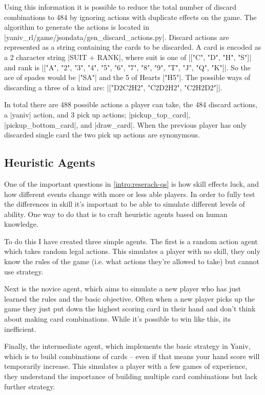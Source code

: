 \documentclass[../main.tex]{subfiles}
\begin{document}
Using this information it is possible to reduce the total number of discard combinations to 484 by ignoring actions with duplicate effects on the game. The algorithm to generate the actions is located in |yaniv_rl/game/jsondata/gen_discard_actions.py|. Discard actions are represented as a string containing the cards to be discarded. A card is encoded as a 2 character string |SUIT + RANK|, where suit is one of |["C", "D", "H", "S"]| and rank is |["A", "2", "3", "4", "5", "6", "7", "8", "9", "T", "J", "Q", "K"]|. So the ace of spades would be |"SA"| and the 5 of Hearts |"H5"|. The possible ways of discarding a three of a kind are: |["D2C2H2", "C2D2H2", "C2H2D2"]|. 

In total there are 488 possible actions a player can take, the 484 discard actions, a |yaniv| action, and 3 pick up actions; |pickup_top_card|, |pickup_bottom_card|, and |draw_card|. When the previous player has only 
discarded single card the two pick up actions are synonymous. 


\subsection{Heuristic Agents} \label{method:rule_agents}
One of the important questions in \cref{intro:reserach-qs} is how skill effects luck, and how different events change with more or less able players. In order to fully test the differences in skill it's important to be able to simulate different levels of ability. One way to do that is to craft heuristic agents based on human knowledge. 

To do this I have created three simple agents. The first is a random action agent which takes random legal actions. This simulates a player with no skill, they only know the rules of the game (i.e. what actions they're allowed to take) but cannot use strategy.

Next is the novice agent, which aims to simulate a new player who has just learned the rules and the basic objective. Often when a new player picks up the game they just put down the highest scoring card in their hand and don't think about making card combinations. While it's possible to win like this, its inefficient.

Finally, the intermediate agent, which implements the basic strategy in Yaniv, which is to build combinations of cards -- even if that means your hand score will temporarily increase. This simulates a player with a few games of experience, they understand the importance of building multiple card combinations but lack further strategy. 
\end{document}
